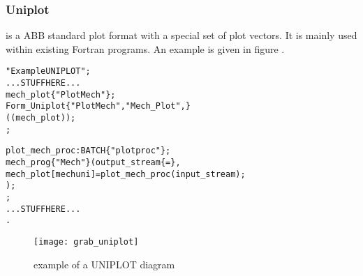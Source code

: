 \subsubsection{Uniplot}
\label{sec:uiuniplot}
\UNIPLOT{} is a ABB standard plot format with
a special set of plot vectors. It is mainly used within existing
Fortran programs. An example is given in figure .




\begin{boxedminipage}[t]{\linewidth}
\begin{alltt}
\DESCRIPTION "Example UNIPLOT";
  ... STUFF HERE ...
\UIMANAGER
  \UNIPLOT
    mech_plot\{ "Plot Mech" \};
  \FORM
    Form_Uniplot \{"Plot Mech", \HELPKEY "Mech_Plot", \HIDECYCLE\}
      ( ( mech_plot ) );
\END \UIMANAGER;

\OPERATOR
  \PROCESS  plot_mech_proc : BATCH \{"plotproc"\};
  \PROCESSGROUP
    mech_prog \{"Mech"\}(output_stream \{\DISPLAY=\NONE\},
                       mech_plot[mechuni] = plot_mech_proc( input_stream );
                     );
\END \OPERATOR;
  ... STUFF HERE ...
\END.
\end{alltt}
\end{boxedminipage}



\begin{figure}[h]
   \begin{center}
      \texttt{[image: grab\_uniplot]}
   \end{center}
\caption{example of a UNIPLOT diagram}
  \label{fig:uniplot}
\end{figure}

